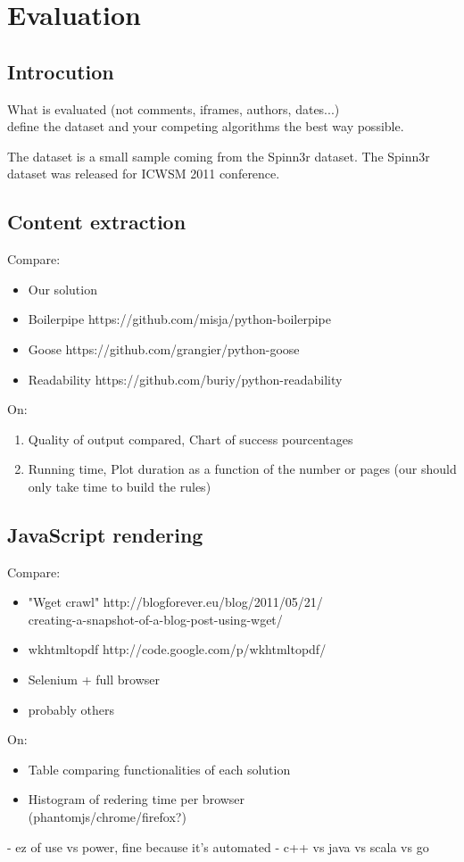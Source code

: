 \section{Evaluation}

\subsection{Introcution}
What is evaluated (not comments, iframes, authors, dates...)
\\ define the dataset and your competing algorithms the best way possible.

The dataset is a small sample coming from the Spinn3r dataset. The Spinn3r dataset was released for ICWSM 2011 conference.

\subsection{Content extraction}
Compare:
\begin{itemize}
  \item Our solution
  \item Boilerpipe https://github.com/misja/python-boilerpipe
  \item Goose https://github.com/grangier/python-goose
  \item Readability https://github.com/buriy/python-readability
\end{itemize}
On:
\begin{enumerate}
  \item Quality of output compared, Chart of success pourcentages
  \item Running time, Plot duration as a function of the number or pages (our should only take time to build the rules)
\end{enumerate}


\subsection{JavaScript rendering}
Compare:
\begin{itemize}
  \item "Wget crawl" http://blogforever.eu/blog/2011/05/21/\\creating-a-snapshot-of-a-blog-post-using-wget/
  \item wkhtmltopdf http://code.google.com/p/wkhtmltopdf/
  \item Selenium + full browser
  \item probably others
\end{itemize}
On:
\begin{itemize}
  \item Table comparing functionalities of each solution
  \item Histogram of redering time per browser\\(phantomjs/chrome/firefox?)
\end{itemize}

- ez of use vs power, fine because it's automated
- c++ vs java vs scala vs go \cite{hundt2011}


